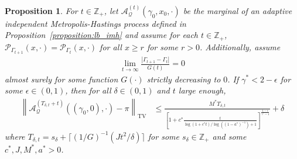 \documentclass[12pt]{article}
\theoremstyle{plain}
\newtheorem{proposition}[theorem]{Proposition}
\theoremstyle{remark}
\newcommand{\norm}[1]{\left\lVert#1\right\rVert}
\newcommand{\e}{\epsilon}
\newcommand{\Z}{\mathbb{Z}}
\newcommand{\Q}{\mathcal{Q}}
\renewcommand{\P}{\mathcal{P}}
\newcommand{\A}{\mathcal{A}}
\begin{document}
\begin{proposition}
\label{proposition:adaptive_mhi_ub}
For $t \in \Z_+$, let $\A_{\Q}^{(t)}(\gamma_0, x_0, \cdot)$ be the marginal of an adaptive independent Metropolis-Hastings process defined in Proposition~\ref{proposition:lb_imh} and assume for each $t \in \Z_+$, $\P_{\Gamma_{t + 1}}(x, \cdot) = \P_{\Gamma_{t}}(x, \cdot)$ for all $x \ge r$ for some $r > 0$.
Additionally, assume
\begin{align*}
\lim_{t \to \infty} \frac{ \left| \Gamma_{t + 1} - \Gamma_t \right| }{ G(t) }
= 0
\end{align*}
almost surely for some function $G(\cdot)$ strictly decreasing to $0$.
If $\gamma^* < 2 - \e$ for some $\e \in (0, 1)$, then for all $\delta \in (0, 1)$ and $t$ large enough,
\begin{align*}
\norm{ \A_{\Q}^{(T_{\delta, t} + t)}((\gamma_0, 0), \cdot) - \pi }_{\text{TV}}
&\le \frac{ M^* T_{\delta, t}}{ \left[ 
1 + c^* \frac{t}{\log( 1 + c^* t )/\log( (1-a^* )^{-1}) + 1}
\right]^{ \frac{1 - \e}{\gamma^* - 1}} }
+ \delta
\end{align*}
where $T_{\delta, t} = s_\delta + \lceil (1/G)^{-1}\left( J t^2 / \delta \right) \rceil$ for some $s_\delta \in \Z_+$ and some $c^*, J, M^*, a^*  > 0$.
\end{proposition}
\end{document}
